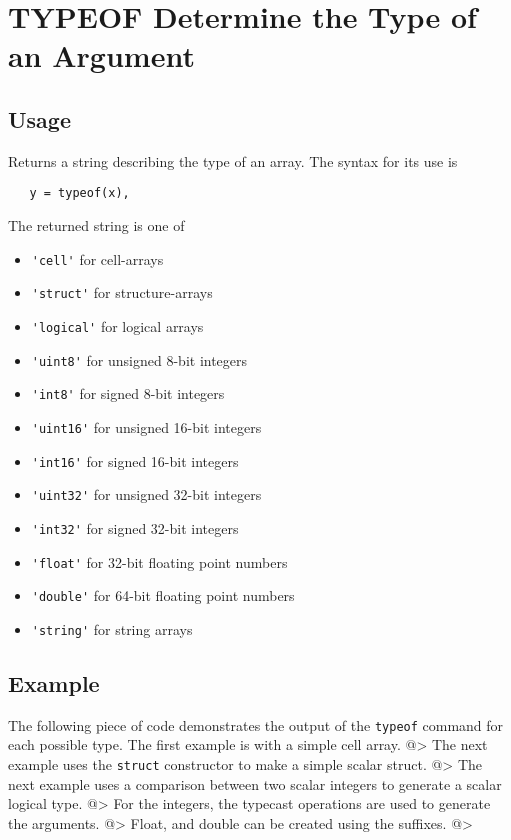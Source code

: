 \section{TYPEOF Determine the Type of an Argument}

\subsection{Usage}

Returns a string describing the type of an array.  The syntax for its use is
\begin{verbatim}
   y = typeof(x),
\end{verbatim}
The returned string is one of
\begin{itemize}
\item  \verb|'cell'| for cell-arrays

\item  \verb|'struct'| for structure-arrays

\item  \verb|'logical'| for logical arrays

\item  \verb|'uint8'| for unsigned 8-bit integers

\item  \verb|'int8'| for signed 8-bit integers

\item  \verb|'uint16'| for unsigned 16-bit integers

\item  \verb|'int16'| for signed 16-bit integers

\item  \verb|'uint32'| for unsigned 32-bit integers

\item  \verb|'int32'| for signed 32-bit integers

\item  \verb|'float'| for 32-bit floating point numbers

\item  \verb|'double'| for 64-bit floating point numbers

\item  \verb|'string'| for string arrays

\end{itemize}
\subsection{Example}

The following piece of code demonstrates the output of the \verb|typeof| 
command for each possible type.  The first example is with a simple cell array.
@>
The next example uses the \verb|struct| constructor to make a simple scalar struct.
@>
The next example uses a comparison between two scalar integers to generate 
a scalar logical type.
@>
For the integers, the typecast operations are used to generate the arguments.
@>
Float, and double can be created using the suffixes.
@>

